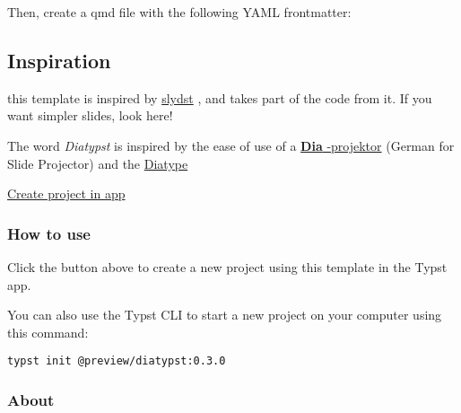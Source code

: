 Then, create a qmd file with the following YAML frontmatter:

\begin{Shaded}
\begin{Highlighting}[]
\KeywordTok{:}\AttributeTok{ }
\end{Highlighting}
\end{Shaded}

\subsection{Inspiration}\label{inspiration}

this template is inspired by
\href{https://github.com/glambrechts/slydst}{slydst} , and takes part of
the code from it. If you want simpler slides, look here!

The word \emph{Diatypst} is inspired by the ease of use of a
\href{https://de.wikipedia.org/wiki/Diaprojektor}{\textbf{Dia}
-projektor} (German for Slide Projector) and the
\href{https://en.wikipedia.org/wiki/Diatype_(machine)}{Diatype}

\href{/app?template=diatypst&version=0.3.0}{Create project in app}

\subsubsection{How to use}\label{how-to-use}

Click the button above to create a new project using this template in
the Typst app.

You can also use the Typst CLI to start a new project on your computer
using this command:

\begin{verbatim}
typst init @preview/diatypst:0.3.0
\end{verbatim}



\subsubsection{About}\label{about}

